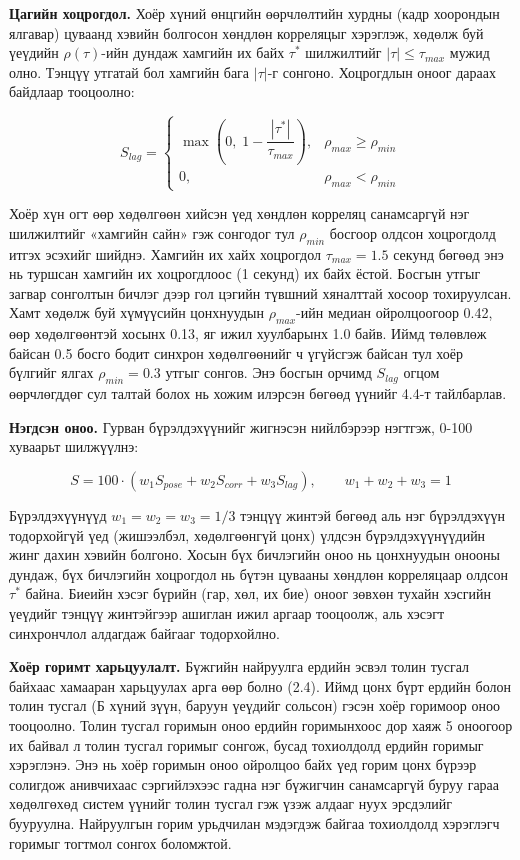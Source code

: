 \textbf{Цагийн хоцрогдол.} Хоёр хүний өнцгийн өөрчлөлтийн хурдны (кадр хоорондын ялгавар) цуваанд хэвийн болгосон хөндлөн корреляцыг хэрэглэж, хөдөлж буй үеүдийн \(\rho(\tau)\)-ийн дундаж хамгийн их байх \(\tau^{*}\) шилжилтийг \(|\tau| \le \tau_{max}\) мужид олно. Тэнцүү утгатай бол хамгийн бага \(|\tau|\)-г сонгоно. Хоцрогдлын оноог дараах байдлаар тооцоолно:

\begin{equation}
S_{lag} = \begin{cases} \max\left(0, \; 1 - \dfrac{|\tau^{*}|}{\tau_{max}}\right), & \rho_{max} \ge \rho_{min} \\ 0, & \rho_{max} < \rho_{min} \end{cases}
\end{equation}

Хоёр хүн огт өөр хөдөлгөөн хийсэн үед хөндлөн корреляц санамсаргүй нэг шилжилтийг «хамгийн сайн» гэж сонгодог тул \(\rho_{min}\) босгоор олдсон хоцрогдолд итгэх эсэхийг шийднэ. Хамгийн их хайх хоцрогдол \(\tau_{max} = 1.5\) секунд бөгөөд энэ нь туршсан хамгийн их хоцрогдлоос (1 секунд) их байх ёстой. Босгын утгыг загвар сонголтын бичлэг дээр гол цэгийн түвшний хяналттай хосоор тохируулсан. Хамт хөдөлж буй хүмүүсийн цонхнуудын \(\rho_{max}\)-ийн медиан ойролцоогоор 0.42, өөр хөдөлгөөнтэй хосынх 0.13, яг ижил хуулбарынх 1.0 байв. Иймд төлөвлөж байсан 0.5 босго бодит синхрон хөдөлгөөнийг ч үгүйсгэж байсан тул хоёр бүлгийг ялгах \(\rho_{min} = 0.3\) утгыг сонгов. Энэ босгын орчимд \(S_{lag}\) огцом өөрчлөгддөг сул талтай болох нь хожим илэрсэн бөгөөд үүнийг 4.4-т тайлбарлав.

\textbf{Нэгдсэн оноо.} Гурван бүрэлдэхүүнийг жигнэсэн нийлбэрээр нэгтгэж, 0-100 хуваарьт шилжүүлнэ:

\begin{equation}
S = 100 \cdot \left( w_1 S_{pose} + w_2 S_{corr} + w_3 S_{lag} \right), \qquad w_1 + w_2 + w_3 = 1
\end{equation}

Бүрэлдэхүүнүүд \(w_1 = w_2 = w_3 = 1/3\) тэнцүү жинтэй бөгөөд аль нэг бүрэлдэхүүн тодорхойгүй үед (жишээлбэл, хөдөлгөөнгүй цонх) үлдсэн бүрэлдэхүүнүүдийн жинг дахин хэвийн болгоно. Хосын бүх бичлэгийн оноо нь цонхнуудын онооны дундаж, бүх бичлэгийн хоцрогдол нь бүтэн цувааны хөндлөн корреляцаар олдсон \(\tau^{*}\) байна. Биеийн хэсэг бүрийн (гар, хөл, их бие) оноог зөвхөн тухайн хэсгийн үеүдийг тэнцүү жинтэйгээр ашиглан ижил аргаар тооцоолж, аль хэсэгт синхрончлол алдагдаж байгааг тодорхойлно.

\textbf{Хоёр горимт харьцуулалт.} Бүжгийн найруулга ердийн эсвэл толин тусгал байхаас хамааран харьцуулах арга өөр болно (2.4). Иймд цонх бүрт ердийн болон толин тусгал (Б хүний зүүн, баруун үеүдийг сольсон) гэсэн хоёр горимоор оноо тооцоолно. Толин тусгал горимын оноо ердийн горимынхоос дор хаяж 5 оноогоор их байвал л толин тусгал горимыг сонгож, бусад тохиолдолд ердийн горимыг хэрэглэнэ. Энэ нь хоёр горимын оноо ойролцоо байх үед горим цонх бүрээр солигдож анивчихаас сэргийлэхээс гадна нэг бүжигчин санамсаргүй буруу гараа хөдөлгөхөд систем үүнийг толин тусгал гэж үзэж алдааг нуух эрсдэлийг бууруулна. Найруулгын горим урьдчилан мэдэгдэж байгаа тохиолдолд хэрэглэгч горимыг тогтмол сонгох боломжтой.

